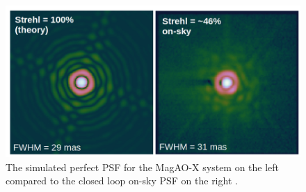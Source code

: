 \begin{figure}
    \centering
    \includegraphics[width=.8\textwidth]{Chapter Materials/Chapter Three Materials/Magaoxonsky.jpg}
    \caption{The simulated perfect PSF for the MagAO-X system on the left compared to the closed loop on-sky PSF on the right \citep{males2020magao}.}
    \label{fig:magaoxonsky}
\end{figure}